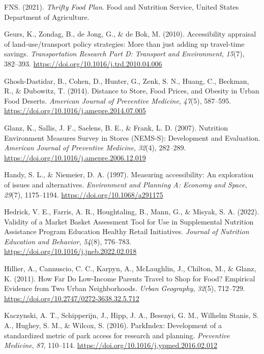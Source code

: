 \documentclass[
  letterpaper,
  number,
  review,
  3p]{elsarticle}
\newlength{\cslhangindent}
\newenvironment{CSLReferences}[2] %
 {\begin{list}{}{%
  \setlength{\itemindent}{0pt}
  \setlength{\leftmargin}{0pt}
  \setlength{\parsep}{0pt}
  \ifodd #1
   \setlength{\leftmargin}{\cslhangindent}
   \setlength{\itemindent}{-1\cslhangindent}
  \fi
  \setlength{\itemsep}{#2\baselineskip}}}
 {\end{list}}
\begin{document}
\begin{CSLReferences}{1}{0}
FNS. (2021). \emph{Thrifty {Food Plan}}. {Food and Nutrition Service,
United States Department of Agriculture}.

Geurs, K., Zondag, B., de Jong, G., \& de Bok, M. (2010). Accessibility
appraisal of land-use/transport policy strategies: {More} than just
adding up travel-time savings. \emph{Transportation Research Part D:
Transport and Environment}, \emph{15}(7), 382--393.
\url{https://doi.org/10.1016/j.trd.2010.04.006}

Ghosh-Dastidar, B., Cohen, D., Hunter, G., Zenk, S. N., Huang, C.,
Beckman, R., \& Dubowitz, T. (2014). Distance to {Store}, {Food Prices},
and {Obesity} in {Urban Food Deserts}. \emph{American Journal of
Preventive Medicine}, \emph{47}(5), 587--595.
\url{https://doi.org/10.1016/j.amepre.2014.07.005}

Glanz, K., Sallis, J. F., Saelens, B. E., \& Frank, L. D. (2007).
Nutrition {Environment Measures Survey} in {Stores} ({NEMS-S}):
{Development} and {Evaluation}. \emph{American Journal of Preventive
Medicine}, \emph{32}(4), 282--289.
\url{https://doi.org/10.1016/j.amepre.2006.12.019}

Handy, S. L., \& Niemeier, D. A. (1997). Measuring accessibility: {An}
exploration of issues and alternatives. \emph{Environment and Planning
A: Economy and Space}, \emph{29}(7), 1175--1194.
\url{https://doi.org/10.1068/a291175}

Hedrick, V. E., Farris, A. R., Houghtaling, B., Mann, G., \& Misyak, S.
A. (2022). Validity of a {Market Basket Assessment Tool} for {Use} in
{Supplemental Nutrition Assistance Program Education Healthy Retail
Initiatives}. \emph{Journal of Nutrition Education and Behavior},
\emph{54}(8), 776--783. \url{https://doi.org/10.1016/j.jneb.2022.02.018}

Hillier, A., Cannuscio, C. C., Karpyn, A., McLaughlin, J., Chilton, M.,
\& Glanz, K. (2011). How {Far Do Low-Income Parents Travel} to {Shop}
for {Food}? {Empirical Evidence} from {Two Urban Neighborhoods}.
\emph{Urban Geography}, \emph{32}(5), 712--729.
\url{https://doi.org/10.2747/0272-3638.32.5.712}

Kaczynski, A. T., Schipperijn, J., Hipp, J. A., Besenyi, G. M., Wilhelm
Stanis, S. A., Hughey, S. M., \& Wilcox, S. (2016). {ParkIndex}:
{Development} of a standardized metric of park access for research and
planning. \emph{Preventive Medicine}, \emph{87}, 110--114.
\url{https://doi.org/10.1016/j.ypmed.2016.02.012}


\end{CSLReferences}
\end{document}
